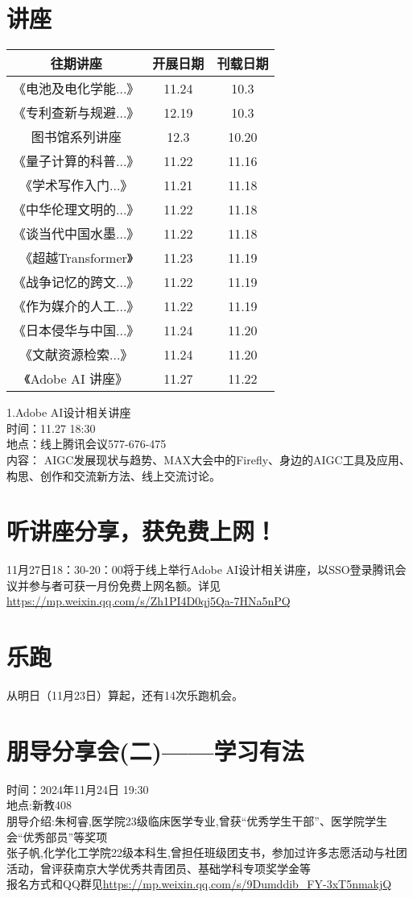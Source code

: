 \documentclass[letterpaper, 12pt]{article}
\begin{document}
\begin{multicols}{2}

\section{讲座}
\begin{tabular}{|c|c|c|}
    \hline
    往期讲座 & 开展日期 & 刊载日期\\
    \hline\hline
    《电池及电化学能...》 & 11.24 & 10.3\\
    《专利查新与规避...》 & 12.19 & 10.3\\
    图书馆系列讲座 & 12.3 & 10.20\\
    《量子计算的科普...》 & 11.22 & 11.16\\
    《学术写作入门...》& 11.21 & 11.18\\
    《中华伦理文明的...》& 11.22 & 11.18\\
    《谈当代中国水墨...》& 11.22 & 11.18\\
    《超越Transformer》 & 11.23 & 11.19\\
    《战争记忆的跨文...》 & 11.22 & 11.19\\
    《作为媒介的人工...》 & 11.22 & 11.19\\
    《日本侵华与中国...》 & 11.24 & 11.20\\
    《文献资源检索...》 & 11.24 & 11.20\\
    《Adobe AI 讲座》 & 11.27 & 11.22\\
    \hline
\end{tabular}

1.Adobe AI设计相关讲座\\
时间：11.27 18:30\\
地点：线上腾讯会议577-676-475\\
内容： AIGC发展现状与趋势、MAX大会中的Firefly、身边的AIGC工具及应用、构思、创作和交流新方法、线上交流讨论。
\section{听讲座分享，获免费上网！}
11月27日18：30-20：00将于线上举行Adobe AI设计相关讲座，以SSO登录腾讯会议并参与者可获一月份免费上网名额。详见\url{https://mp.weixin.qq.com/s/Zh1PI4D0qj5Qa-7HNa5nPQ}
\section{乐跑}
从明日（11月23日）算起，还有14次乐跑机会。
\section{朋导分享会(二)——学习有法}
时间：2024年11月24日 19:30\\
地点:新教408\\
朋导介绍:朱柯睿,医学院23级临床医学专业,曾获“优秀学生干部”、医学院学生会“优秀部员”等奖项\\
张子帆,化学化工学院22级本科生,曾担任班级团支书，参加过许多志愿活动与社团活动，曾评获南京大学优秀共青团员、基础学科专项奖学金等\\
报名方式和QQ群见\url{https://mp.weixin.qq.com/s/9Dumddib_FY-3xT5nmakjQ}

\end{multicols}
\end{document}
